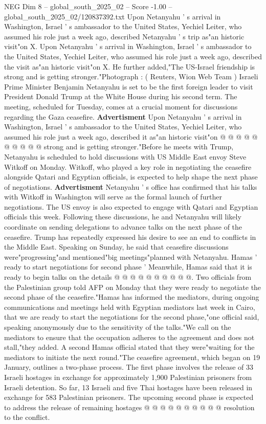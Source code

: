 \begin{textsample}{NEG Dim 8 – global\_south\_2025\_02 – Score -1.00 – global\_south\_2025\_02/120837392.txt}  \label{ex:f8_neg_065}
Upon Netanyahu ' s arrival in Washington, Israel ' s ambassador to the United States, Yechiel Leiter, who assumed his role just a week ago, described Netanyahu ' s trip as"an historic visit"on X.
Upon Netanyahu ' s arrival in Washington, Israel ' s ambassador to the United States, Yechiel Leiter, who assumed his role just a week ago, described the visit as"an historic visit"on X.
He further added,"The US-Israel friendship is strong and is getting stronger."Photograph : ( Reuters, Wion Web Team ) Israeli Prime Minister Benjamin Netanyahu is set to be the first foreign leader to visit President Donald Trump at the White House during his second term.
The meeting, scheduled for Tuesday, comes at a crucial moment for discussions regarding the Gaza ceasefire. \textbf{Advertisment} Upon Netanyahu ' s arrival in Washington, Israel ' s ambassador to the United States, Yechiel Leiter, who assumed his role just a week ago, described it as"an historic visit"on @ @ @ @ @ @ @ @ @ @ strong and is getting stronger."Before he meets with Trump, Netanyahu is scheduled to hold discussions with US Middle East envoy Steve Witkoff on Monday.
Witkoff, who played a key role in negotiating the ceasefire alongside Qatari and Egyptian officials, is expected to help shape the next phase of negotiations. \textbf{Advertisment} Netanyahu ' s office has confirmed that his talks with Witkoff in Washington will serve as the formal launch of further negotiations.
The US envoy is also expected to engage with Qatari and Egyptian officials this week.
Following these discussions, he and Netanyahu will likely coordinate on sending delegations to advance talks on the next phase of the ceasefire.
Trump has repeatedly expressed his desire to see an end to conflicts in the Middle East.
Speaking on Sunday, he said that ceasefire discussions were"progressing"and mentioned"big meetings"planned with Netanyahu.
Hamas ' ready to start negotiations for second phase ' Meanwhile, Hamas said that it is ready to begin talks on the details @ @ @ @ @ @ @ @ @ @.
Two officials from the Palestinian group told AFP on Monday that they were ready to negotiate the second phase of the ceasefire."Hamas has informed the mediators, during ongoing communications and meetings held with Egyptian mediators last week in Cairo, that we are ready to start the negotiations for the second phase,"one official said, speaking anonymously due to the sensitivity of the talks."We call on the mediators to ensure that the occupation adheres to the agreement and does not stall,"they added.
A second Hamas official stated that they were"waiting for the mediators to initiate the next round."The ceasefire agreement, which began on 19 January, outlines a two-phase process.
The first phase involves the release of 33 Israeli hostages in exchange for approximately 1,900 Palestinian prisoners from Israeli detention.
So far, 13 Israeli and five Thai hostages have been released in exchange for 583 Palestinian prisoners.
The upcoming second phase is expected to address the release of remaining hostages @ @ @ @ @ @ @ @ @ @ resolution to the conflict.

\end{textsample}
